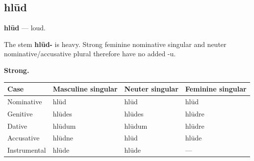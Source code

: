 \subsection*{hlūd}

\par\begin{minipage}{\linewidth}\raggedright
\textbf{hlūd} — loud.

The stem \textbf{hlūd-} is heavy. Strong feminine nominative singular and neuter nominative/\allowbreak{}accusative plural therefore have no added -u.

\textbf{Strong.}

\par\begingroup
\fontsize{10.5}{13.2}\selectfont
\par\begin{minipage}{\linewidth}\raggedright
\setlength{\LTleft}{0pt}\setlength{\LTright}{\fill}
\noindent
\begin{tabular}{@{}>{\raggedright\arraybackslash}p{22mm}>{\raggedright\arraybackslash}p{31.18mm}>{\raggedright\arraybackslash}p{31.18mm}>{\raggedright\arraybackslash}p{31.18mm}@{}}
\toprule
\textbf{Case} & \textbf{Masculine singular} & \textbf{Neuter singular} & \textbf{Feminine singular} \\
\midrule
Nominative & hlūd & hlūd & hlūd \\
Genitive & hlūdes & hlūdes & hlūdre \\
Dative & hlūdum & hlūdum & hlūdre \\
Accusative & hlūdne & hlūd & hlūde \\
Instrumental & hlūde & hlūde & — \\
\bottomrule
\end{tabular}
\end{minipage}\par
\par\endgroup
\end{minipage}\par
\par\addvspace{5pt}
\par\begingroup
\fontsize{10.5}{13.2}\selectfont
